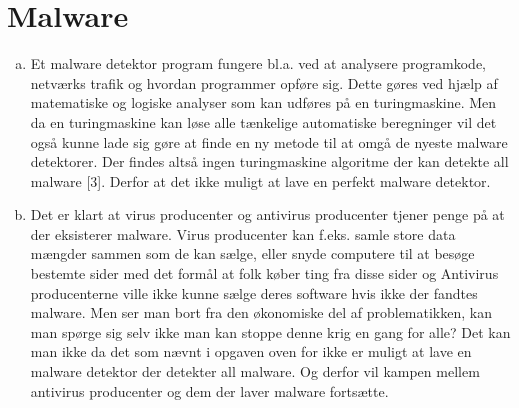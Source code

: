 \documentclass[12pt]{article}
\begin{document}
\section{Malware}
\begin{enumerate}[(a)]

\item
Et malware detektor program fungere bl.a. ved at analysere programkode, netværks trafik og hvordan
programmer opføre sig. Dette gøres ved hjælp af matematiske og logiske analyser som kan udføres på 
en turingmaskine. Men da en turingmaskine kan løse alle tænkelige automatiske beregninger vil det
også kunne lade sig gøre at finde en ny metode til at omgå de nyeste malware detektorer. Der findes
altså ingen turingmaskine algoritme der kan detekte all malware [3]. Derfor at det ikke muligt at lave
en perfekt malware detektor.
\item
Det er klart at virus producenter og antivirus producenter tjener penge på at der eksisterer malware.
Virus producenter kan f.eks. samle store data mængder sammen som de kan sælge, eller snyde computere
til at besøge bestemte sider med det formål at folk køber ting fra disse sider og Antivirus producenterne 
ville ikke kunne sælge deres software hvis ikke der fandtes malware. Men ser man bort fra den økonomiske
del af problematikken, kan man spørge sig selv ikke man kan stoppe denne krig en gang for alle? Det kan
man ikke da det som nævnt i opgaven oven for ikke er muligt at lave en malware detektor der detekter all
malware. Og derfor vil kampen mellem antivirus producenter og dem der laver malware fortsætte. 


\end{enumerate}
\end{document}
